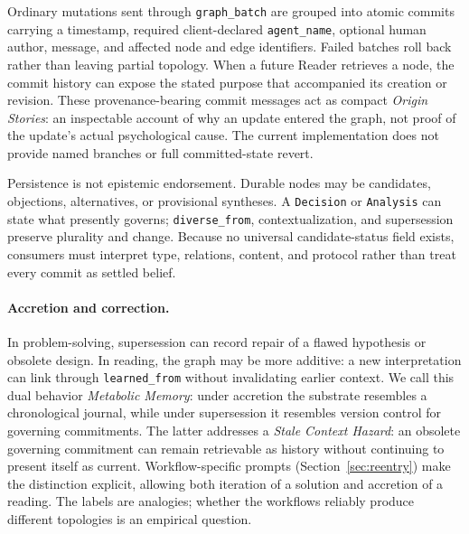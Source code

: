 Ordinary mutations sent through \texttt{graph\_batch} are grouped into atomic commits carrying a timestamp, required client-declared \texttt{agent\_name}, optional human author, message, and affected node and edge identifiers. Failed batches roll back rather than leaving partial topology. When a future Reader retrieves a node, the commit history can expose the stated purpose that accompanied its creation or revision. These provenance-bearing commit messages act as compact \emph{Origin Stories}: an inspectable account of why an update entered the graph, not proof of the update's actual psychological cause. The current implementation does not provide named branches or full committed-state revert.

Persistence is not epistemic endorsement. Durable nodes may be candidates, objections, alternatives, or provisional syntheses. A \texttt{Decision} or \texttt{Analysis} can state what presently governs; \texttt{diverse\_from}, contextualization, and supersession preserve plurality and change. Because no universal candidate-status field exists, consumers must interpret type, relations, content, and protocol rather than treat every commit as settled belief.

\paragraph{Accretion and correction.} In problem-solving, supersession can record repair of a flawed hypothesis or obsolete design. In reading, the graph may be more additive: a new interpretation can link through \texttt{learned\_from} without invalidating earlier context. We call this dual behavior \emph{Metabolic Memory}: under accretion the substrate resembles a chronological journal, while under supersession it resembles version control for governing commitments. The latter addresses a \emph{Stale Context Hazard}: an obsolete governing commitment can remain retrievable as history without continuing to present itself as current. Workflow-specific prompts (Section~\ref{sec:reentry}) make the distinction explicit, allowing both iteration of a solution and accretion of a reading. The labels are analogies; whether the workflows reliably produce different topologies is an empirical question.


